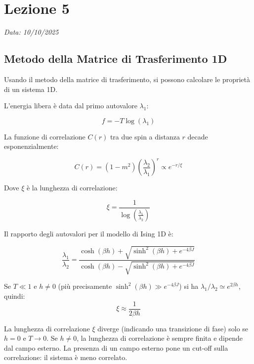 \chapter{Lezione 5}
\label{chap:lezione_05} 

\begin{flushright}
\textit{Data: 10/10/2025}
\end{flushright}

\section{Metodo della Matrice di Trasferimento 1D}

Usando il metodo della matrice di trasferimento, si possono calcolare le proprietà di un sistema 1D.

L'energia libera è data dal primo autovalore $\lambda_1$:

\begin{equation}
f = -T \log(\lambda_1)
\end{equation}


La funzione di correlazione $C(r)$ tra due spin a distanza $r$ decade esponenzialmente:

\begin{equation}
C(r) = (1-m^2) \left(\frac{\lambda_2}{\lambda_1}\right)^r \propto e^{-r/\xi}
\end{equation}


Dove $\xi$ è la lunghezza di correlazione:

\begin{equation}
\xi = \frac{1}{\log \left(\frac{\lambda_1}{ \lambda_2}\right)}
\end{equation}


Il rapporto degli autovalori per il modello di Ising 1D  è:

\begin{equation}
\frac{\lambda_1}{ \lambda_2}=\frac{\cosh(\beta h) + \sqrt{\sinh^2(\beta h) + e^{-4\beta J}}}{\cosh(\beta h) - \sqrt{\sinh^2(\beta h) + e^{-4\beta J}}}
\end{equation}

Se $T \ll 1$ e $h \neq 0$ (più precisamente $\sinh^2(\beta h) \gg e^{-4\beta J}$) si ha $\lambda_1/\lambda_2 \simeq e^{2\beta h}$, quindi:
\begin{equation}
    \xi \approx \frac{1}{2 \beta h}
\end{equation}

La lunghezza di correlazione $\xi$ diverge (indicando una transizione di fase) solo se $h=0$ e $T \to 0$. Se $h \neq 0$, la lunghezza di correlazione è sempre finita e dipende dal campo esterno. La presenza di un campo esterno pone un cut-off sulla correlazione: il sistema è meno correlato.

